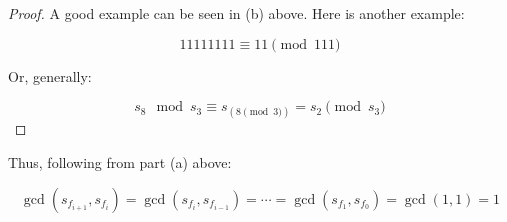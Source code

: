 \begin{problem}
\begin{enumerate}
\begin{Answer}
\begin{proof}
\noindent
A good example can be seen in (b) above.
Here is another example:

\begin{equation}
  11111111 \equiv 11  \pmod{111}
\end{equation}

\noindent
Or, generally:

\begin{equation}
  s_{8} \mod s_{3} \equiv s_{(8\pmod{3})} = s_{2} \pmod{s_{3}}
\end{equation}
\end{proof}

Thus, following from part (a) above:

\begin{equation}
  \gcd(s_{f_{i+1}}, s_{f_{i}}) = \gcd(s_{f_{i}}, s_{f_{i-1}}) = \cdots = \gcd(s_{f_{1}}, s_{f_{0}}) = \gcd(1, 1) = 1
\end{equation}

\end{Answer}
\end{enumerate}
\end{problem}
